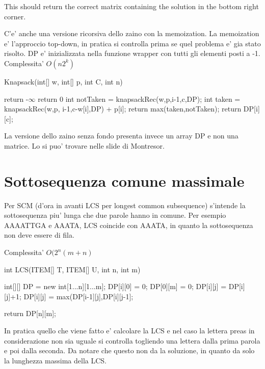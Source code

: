 \documentclass[oneside]{book}
\begin{document}
This should return the correct matrix containing the solution in the bottom right corner.

C'e' anche una versione ricorsiva dello zaino con la memoization. La memoization e' l'approccio top-down, in pratica si controlla prima se quel problema e' gia stato risolto. DP e' inizializzata nella funzione wrapper con tutti gli elementi posti a -1.
Complessita' $O(n2^k)$

\begin{algorithm}
\caption{Knapsack(int[] w, int[] p, int C, int n)}\label{alg:cap}
\begin{algorithmic}
	\State return -$\infty$ 
	\State return 0
\Else
	\State {}
			\State int notTaken = knapsackRec(w,p,i-1,c,DP);
			\State int taken = knapsackRec(w,p, i-1,c-w[i],DP) + p[i];
			\State return max(taken,notTaken);
		\EndIf
	\EndIf
	\State return DP[i][c];

\end{algorithmic}
\end{algorithm}

La versione dello zaino senza fondo presenta invece un array DP e non una matrice. Lo si puo' trovare nelle slide di Montresor.


\section{Sottosequenza comune massimale}
Per SCM (d'ora in avanti LCS per longest common subsequence) s'intende la sottosequenza piu' lunga che due parole hanno in comune. Per esempio\\
AAAATTGA e AAATA, LCS coincide con AAATA, in quanto la sottosequenza non deve essere di fila.

Complessita' $O(2^n(m+n)$

\begin{algorithm}
\caption{int LCS(ITEM[] T, ITEM[] U, int n, int m)}\label{alg:cap}
\begin{algorithmic}
\State int[][] DP = new int[1...n][1...m];
	\State DP[i][0] = 0;
\EndFor
{}
	\State DP[0][m] = 0;
\EndFor
{}
			DP[i][j] = DP[i][j]+1;
			\Else
				\State DP[i][j] = max(DP[i-1][j],DP[i][j-1];
		\EndIf
	\EndFor
\EndFor

return DP[n][m];
\end{algorithmic}
\end{algorithm}

In pratica quello che viene fatto e' calcolare la LCS e nel caso la lettera preas in considerazione non sia uguale si controlla togliendo una lettera dalla prima parola e poi dalla seconda. Da notare che questo non da la soluzione, in quanto da solo la lunghezza massima della LCS.
\end{document}
